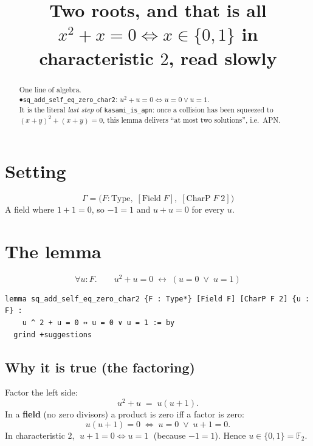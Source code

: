 \documentclass[11pt]{article}
\title{\textbf{Two roots, and that is all}\\[4pt]
\large $x^2+x=0 \iff x\in\{0,1\}$ in characteristic $2$, read slowly}
\author{}
\date{}
\begin{document}
\maketitle

\begin{abstract}
\noindent
One line of algebra.\\[2pt]
$\bullet$\quad \texttt{sq\_add\_self\_eq\_zero\_char2}:\;\;
$u^2+u=0 \iff u=0 \lor u=1$.\\[6pt]
\noindent
It is the literal \emph{last step} of \texttt{kasami\_is\_apn}: once a collision
has been squeezed to $(x+y)^2+(x+y)=0$, this lemma delivers ``at most two
solutions'', i.e.\ APN.
\end{abstract}

\bigskip

\section*{Setting}

\[
\Gamma=\bigl(F:\mathrm{Type},\;[\mathrm{Field}\;F],\;[\mathrm{CharP}\;F\;2]\bigr)
\]
A field where $1+1=0$, so $-1=1$ and $u+u=0$ for every $u$.

\bigskip

\section{The lemma}

\[
\forall u:F.\qquad u^2+u=0 \;\longleftrightarrow\; (u=0 \;\lor\; u=1)
\]

\begin{lstlisting}
lemma sq_add_self_eq_zero_char2 {F : Type*} [Field F] [CharP F 2] {u : F} :
    u ^ 2 + u = 0 ↔ u = 0 ∨ u = 1 := by
  grind +suggestions
\end{lstlisting}


\bigskip
\subsection*{Why it is true (the factoring)}

\noindent
Factor the left side:
\[
u^2+u \;=\; u(u+1).
\]
In a \textbf{field} (no zero divisors) a product is zero iff a factor is zero:
\[
u(u+1)=0 \;\Longleftrightarrow\; u=0 \;\lor\; u+1=0.
\]
In characteristic $2$, $\;u+1=0 \iff u=1\;$ (because $-1=1$). Hence
$u\in\{0,1\}=\mathbb{F}_2$.
\end{document}
